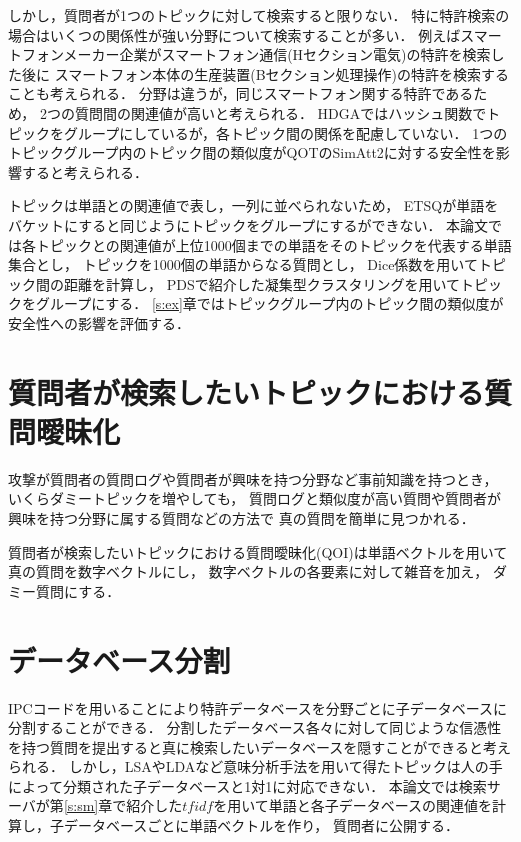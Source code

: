 \documentclass[master]{suribt}
\theoremstyle{definition}
\begin{document}
 しかし，質問者が1つのトピックに対して検索すると限りない．
 特に特許検索の場合はいくつの関係性が強い分野について検索することが多い．
 例えばスマートフォンメーカー企業がスマートフォン通信(Hセクション電気)の特許を検索した後に
 スマートフォン本体の生産装置(Bセクション処理操作)の特許を検索することも考えられる． 
 分野は違うが，同じスマートフォン関する特許であるため，
 2つの質問間の関連値が高いと考えられる．
 HDGAではハッシュ関数でトピックをグループにしているが，各トピック間の関係を配慮していない．
 1つのトピックグループ内のトピック間の類似度がQOTのSimAtt2に対する安全性を影響すると考えられる．

 トピックは単語との関連値で表し，一列に並べられないため，
 ETSQが単語をバケットにすると同じようにトピックをグループにするができない．
 本論文では各トピックとの関連値が上位1000個までの単語をそのトピックを代表する単語集合とし，
 トピックを1000個の単語からなる質問とし，
 Dice係数を用いてトピック間の距離を計算し，
 PDSで紹介した凝集型クラスタリングを用いてトピックをグループにする．
 \ref{s:ex}章ではトピックグループ内のトピック間の類似度が安全性への影響を評価する．

 
 \section{質問者が検索したいトピックにおける質問曖昧化}\label{s:BBBB}
 攻撃が質問者の質問ログや質問者が興味を持つ分野など事前知識を持つとき，
 いくらダミートピックを増やしても，
 質問ログと類似度が高い質問や質問者が興味を持つ分野に属する質問などの方法で
 真の質問を簡単に見つかれる．

 質問者が検索したいトピックにおける質問曖昧化(QOI)は単語ベクトルを用いて真の質問を数字ベクトルにし，
 数字ベクトルの各要素に対して雑音を加え，
 ダミー質問にする．

 
 \section{データベース分割}
 IPCコードを用いることにより特許データベースを分野ごとに子データベースに分割することができる．
 分割したデータベース各々に対して同じような信憑性を持つ質問を提出すると真に検索したいデータベースを隠すことができると考えられる．
 しかし，LSAやLDAなど意味分析手法を用いて得たトピックは人の手によって分類された子データベースと1対1に対応できない．
 本論文では検索サーバが第\ref{s:sm}章で紹介した$tfidf$を用いて単語と各子データベースの関連値を計算し，子データベースごとに単語ベクトルを作り，
 質問者に公開する．
\end{document}
